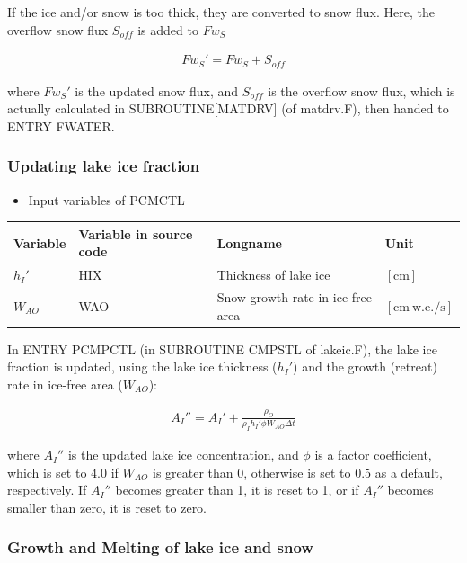 If the ice and/or snow is too thick, they are converted to snow flux. Here, the overflow snow flux \(S_{off}\) is added to \({Fw_S}\)

\begin{eqnarray}
    Fw_S' = Fw_S + S_{off}
\end{eqnarray}

where \(Fw_S'\) is the updated snow flux, and \(S_{off}\) is the overflow snow flux, which is actually calculated in SUBROUTINE{[}MATDRV{]} (of matdrv.F), then handed to ENTRY FWATER.

\subsubsection{Updating lake ice fraction}\label{updating-lake-ice-fraction}

\begin{itemize}
\tightlist
\item
  Input variables of PCMCTL
\end{itemize}

\begin{longtable}[]{@{}llll@{}}
\toprule\noalign{}
Variable & Variable in source code & Longname & Unit \\
\midrule\noalign{}
\endhead
\bottomrule\noalign{}
\endlastfoot
\(h_I'\) & HIX & Thickness of lake ice & \(\mathrm{[cm]}\) \\
\(W_{AO}\) & WAO & Snow growth rate in ice-free area & \(\mathrm{[cm\ w.e./s]}\) \\
\end{longtable}

In ENTRY PCMPCTL (in SUBROUTINE CMPSTL of lakeic.F), the lake ice fraction is updated, using the lake ice thickness (\(h_I'\)) and the growth (retreat) rate in ice-free area (\(W_{AO}\)):

\begin{eqnarray}
    A_I'' = {A_I'} +\frac{\rho_O }{\rho_I h_I' \phi W_{AO}\Delta t}
\end{eqnarray}

where \(A_I''\) is the updated lake ice concentration, and \(\phi\) is a factor coefficient, which is set to \(4.0\) if \(W_{AO}\) is greater than 0, otherwise is set to \(0.5\) as a default,
respectively. If \(A_I''\) becomes greater than 1, it is reset to 1, or if \(A_I''\) becomes smaller than zero, it is reset to zero.

\subsubsection{Growth and Melting of lake ice and snow}\label{growth-and-melting-of-lake-ice-and-snow}

